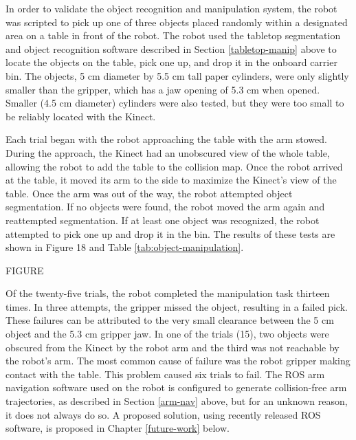 \documentclass[]{cwru} %
\begin{document}
In order to validate the object recognition and manipulation system, the
robot was scripted to pick up one of three objects placed randomly
within a designated area on a table in front of the robot. The robot
used the tabletop segmentation and object recognition software described
in Section \ref{tabletop-manip} above to locate the objects on the table, pick one up,
and drop it in the onboard carrier bin. The objects, 5 cm diameter by
5.5 cm tall paper cylinders, were only slightly smaller than the
gripper, which has a jaw opening of 5.3 cm when opened. Smaller (4.5 cm
diameter) cylinders were also tested, but they were too small to be
reliably located with the Kinect.

Each trial began with the robot approaching the table with the arm
stowed. During the approach, the Kinect had an unobscured view of the
whole table, allowing the robot to add the table to the collision map.
Once the robot arrived at the table, it moved its arm to the side to
maximize the Kinect's view of the table. Once the arm was out of the
way, the robot attempted object segmentation. If no objects were found,
the robot moved the arm again and reattempted segmentation. If at least
one object was recognized, the robot attempted to pick one up and drop
it in the bin. The results of these tests are shown in Figure 18 and
Table \ref{tab:object-manipulation}.

FIGURE

Of the twenty-five trials, the robot completed the manipulation task
thirteen times. In three attempts, the gripper missed the object,
resulting in a failed pick. These failures can be attributed to the very
small clearance between the 5 cm object and the 5.3 cm gripper jaw. In
one of the trials (15), two objects were obscured from the Kinect by the
robot arm and the third was not reachable by the robot's arm. The most
common cause of failure was the robot gripper making contact with the
table. This problem caused six trials to fail. The ROS arm navigation
software used on the robot is configured to generate collision-free arm
trajectories, as described in Section \ref{arm-nav} above, but for an unknown
reason, it does not always do so. A proposed solution, using recently
released ROS software, is proposed in Chapter \ref{future-work} below.
\end{document}
